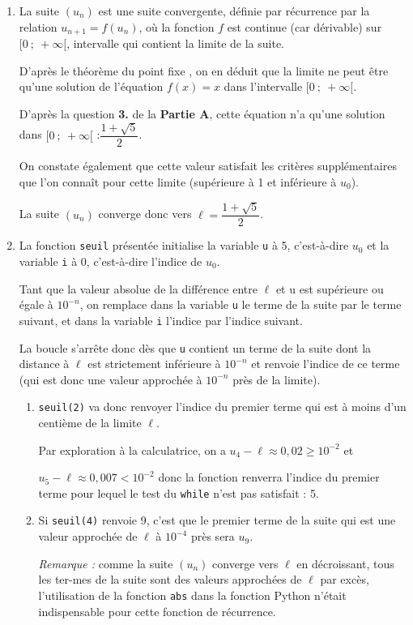 \documentclass[10pt]{article}
\begin{document}
\begin{enumerate}
	\item La suite $\left(u_n\right)$ est une suite convergente, définie par récurrence par la relation \linebreak $u_{n+1} = f(u_n)$, où la fonction $f$ est continue (car dérivable) sur $ [0 ~;~ +\infty[$, intervalle qui contient la limite de la suite.

D'après le théorème \og du point fixe \fg{}, on en déduit que la limite ne peut être qu'une solution de l'équation $f(x) = x$ dans l'intervalle $ [0 ~;~ +\infty[ $.

D'après la question \textbf{3.} de la \textbf{Partie A}, cette équation n'a qu'une solution dans \linebreak $ [0 ~;~ +\infty[ $ :\quad $\dfrac{1+\sqrt{5}}{2}$.

On constate également que cette valeur satisfait les critères supplémentaires que l'on connaît pour cette limite (supérieure à 1 et inférieure à $u_0$).

La suite $\left(u_n\right)$ converge donc vers $\ell = \dfrac{1+\sqrt{5}}{2}$.

	\item La fonction \texttt{seuil} présentée initialise la variable \texttt{u} à 5, c'est-à-dire $u_0$ et la variable \texttt{i} à 0, c'est-à-dire l'indice de $u_0$.

Tant que la valeur absolue de la différence entre $\ell$ et u est supérieure ou égale à $10^{-n}$, on remplace dans la variable \texttt{u} le terme de la suite par le terme suivant, et dans la variable \texttt{i} l'indice par l'indice suivant.

		La boucle s'arrête donc dès que \texttt{u} contient un terme de la suite dont la distance à $\ell$ est strictement inférieure à $10^{-n}$ et renvoie l'indice de ce terme (qui est donc une valeur approchée à $10^{-n}$ près de la limite).
		\begin{enumerate}
			\item \texttt{seuil(2)} va donc renvoyer l'indice du premier terme qui est à moins d'un centième de la limite $\ell$.

Par exploration à la calculatrice, on a $u_4 - \ell \approx 0,02 \geqslant 10^{-2}$ et 

$u_5 - \ell \approx 0,007 < 10^{-2}$ donc la fonction renverra l'indice du premier terme pour lequel le test du \texttt{while} n'est pas satisfait : 5.

			\item Si \texttt{seuil(4)} renvoie 9, c'est que le premier terme de la suite qui est une valeur approchée de $\ell$ à $10^{-4}$ près sera $u_9$.

			\emph{Remarque :} comme la suite $\left(u_n\right)$ converge vers $\ell$ en décroissant, tous les ter-mes de la suite sont des valeurs approchées de $\ell$ par excès, l'utilisation de la fonction \texttt{abs}  dans la fonction Python n'était indispensable pour cette fonction de récurrence.
	\end{enumerate}
\end{enumerate}
\end{document}
